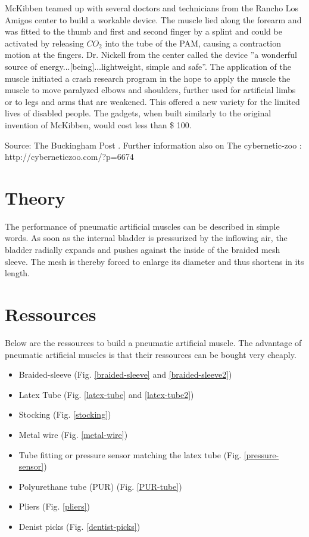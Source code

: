 \documentclass[main]{subfiles}
\begin{document}
McKibben teamed up with several doctors and technicians from the Rancho Los Amigos center to build a workable device. The muscle lied along the forearm and was fitted to the thumb and first and second finger by a splint and could be activated by releasing $CO_2$ into the tube of the PAM, causing a contraction motion at the fingers.
Dr. Nickell from the center called the device ''a wonderful source of energy...[being]...lightweight, simple and safe''. The application of the muscle initiated a crash research program in the hope to apply the muscle the muscle to move paralyzed elbows and shoulders, further used for artificial limbs or to legs and arms that are weakened. This offered a new variety for the limited lives of disabled people. The gadgets, when built similarly to the original invention of McKibben, would cost less than \$ 100.

Source: The Buckingham Post \cite{BuckinghamPost1958}. 
Further information also on The cybernetic-zoo : http://cyberneticzoo.com/?p=6674

\section{Theory}

The performance of pneumatic artificial muscles can be described in simple words. As soon as the internal bladder is pressurized by the inflowing air, the bladder radially expands and pushes against the inside of the braided mesh sleeve. The mesh is thereby forced to enlarge its diameter and thus shortens in its length. 

\section{Ressources}

Below are the ressources to build a pneumatic artificial muscle. The advantage of pneumatic artificial muscles is that their ressources can be bought very cheaply.

\begin{itemize}
\item Braided-sleeve (Fig. \ref{braided-sleeve} and \ref{braided-sleeve2})
\item Latex Tube (Fig. \ref{latex-tube} and \ref{latex-tube2})
\item Stocking (Fig. \ref{stocking})
\item Metal wire (Fig. \ref{metal-wire})
\item Tube fitting or pressure sensor matching the latex tube (Fig. \ref{pressure-sensor})
\item Polyurethane tube (PUR) (Fig. \ref{PUR-tube})
\item Pliers (Fig. \ref{pliers})
\item Denist picks (Fig. \ref{dentist-picks})
\end{itemize}
\end{document}
